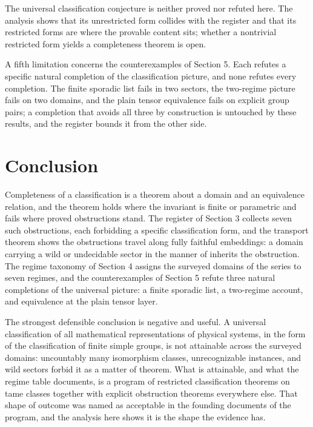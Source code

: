 \documentclass[11pt,letterpaper]{article}
\theoremstyle{definition}
\theoremstyle{remark}
\begin{document}
The universal classification conjecture is neither proved nor refuted here. The analysis shows that its unrestricted form collides with the register and that its restricted forms are where the provable content sits; whether a nontrivial restricted form yields a completeness theorem is open.

A fifth limitation concerns the counterexamples of Section 5. Each refutes a specific natural completion of the classification picture, and none refutes every completion. The finite sporadic list fails in two sectors, the two-regime picture fails on two domains, and the plain tensor equivalence fails on explicit group pairs; a completion that avoids all three by construction is untouched by these results, and the register bounds it from the other side.

\section{Conclusion}

Completeness of a classification is a theorem about a domain and an equivalence relation, and the theorem holds where the invariant is finite or parametric and fails where proved obstructions stand. The register of Section 3 collects seven such obstructions, each forbidding a specific classification form, and the transport theorem shows the obstructions travel along fully faithful embeddings: a domain carrying a wild or undecidable sector in the manner of  inherits the obstruction. The regime taxonomy of Section 4 assigns the surveyed domains of the series to seven regimes, and the counterexamples of Section 5 refute three natural completions of the universal picture: a finite sporadic list, a two-regime account, and equivalence at the plain tensor layer.

The strongest defensible conclusion is negative and useful. A universal classification of all mathematical representations of physical systems, in the form of the classification of finite simple groups, is not attainable across the surveyed domains: uncountably many isomorphism classes, unrecognizable instances, and wild sectors forbid it as a matter of theorem. What is attainable, and what the regime table documents, is a program of restricted classification theorems on tame classes together with explicit obstruction theorems everywhere else. That shape of outcome was named as acceptable in the founding documents of the program, and the analysis here shows it is the shape the evidence has.
\end{document}
